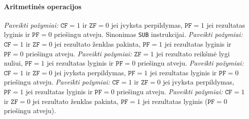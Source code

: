 \documentclass{scrartcl}
\begin{document}
                \paragraph{Aritmetinės operacijos}
                    \emph{Paveikti požymiai:} $\texttt{CF} = 1$ ir $\texttt{ZF} = 0$ jei įvyksta perpildymas, $\texttt{PF} = 1$ jei rezultatas lyginis ir $\texttt{PF} = 0$ priešingu atveju.
                    Sinonimas \texttt{SUB} instrukcijai.
                    \emph{Paveikti požymiai:} $\texttt{CF} = 1$ ir $\texttt{ZF} = 0$ jei rezultato ženklas pakinta, $\texttt{PF} = 1$ jei rezultatas lyginis ir $\texttt{PF} = 0$ priešingu atveju.
                    \emph{Paveikti požymiai:} $\texttt{ZF} = 1$ jei rezultato reikšmė lygi nuliui, $\texttt{PF} = 1$ jei rezultatas lyginis ir $\texttt{PF} = 0$ priešingu atveju.
                    \emph{Paveikti požymiai:} $\texttt{CF} = 1$ ir $\texttt{ZF} = 0$ jei įvyksta perpildymas, $\texttt{PF} = 1$ jei rezultatas lyginis ir $\texttt{PF} = 0$ priešingu atveju.
                    \emph{Paveikti požymiai:} $\texttt{CF} = 1$ ir $\texttt{ZF} = 0$ jei įvyksta perpildymas, $\texttt{PF} = 1$ jei rezultatas lyginis ir $\texttt{PF} = 0$ priešingu atveju.
                    \emph{Paveikti požymiai:} $\texttt{CF} = 1$ ir $\texttt{ZF} = 0$ jei rezultato ženklas pakinta, $\texttt{PF} = 1$ jei rezultatas lyginis ($\texttt{PF} = 0$ priešingu atveju).
\end{document}
